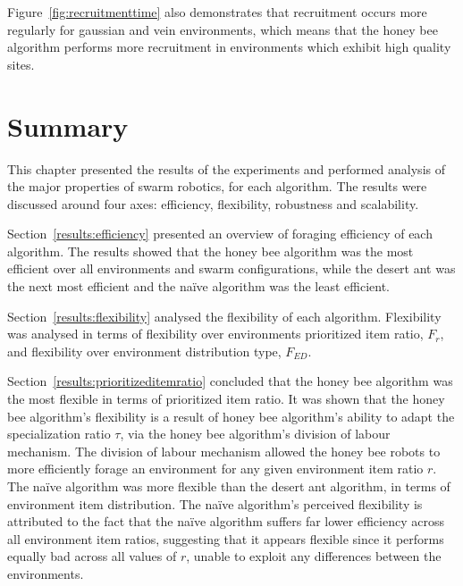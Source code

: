 Figure~\ref{fig:recruitmenttime} also demonstrates that recruitment occurs more regularly for gaussian and vein environments, which means that the honey bee algorithm performs more recruitment in environments which exhibit high quality sites.

\section{Summary}
\label{results:summary}

This chapter presented the results of the experiments and performed analysis of the major properties of swarm robotics, for each algorithm. The results were discussed around four axes: efficiency, flexibility, robustness and scalability. 

Section~\ref{results:efficiency} presented an overview of foraging efficiency of each algorithm. The results showed that the honey bee algorithm was the most efficient over all environments and swarm configurations, while the desert ant was the next most efficient and the na\"ive algorithm was the least efficient.

Section~\ref{results:flexibility} analysed the flexibility of each algorithm. Flexibility was analysed in terms of flexibility over environments prioritized item ratio, $F_r$, and flexibility over environment distribution type, $F_{ED}$. 

Section~\ref{results:prioritizeditemratio} concluded that the honey bee algorithm was the most flexible in terms of prioritized item ratio. It was shown that the honey bee algorithm's flexibility is a result of honey bee algorithm's ability to adapt the specialization ratio $\tau$, via the honey bee algorithm's division of labour mechanism. The division of labour mechanism allowed the honey bee robots to more efficiently forage an environment for any given environment item ratio $r$. The na\"ive algorithm was more flexible than the desert ant algorithm, in terms of environment item distribution. The na\"ive algorithm's perceived flexibility is attributed to the fact that the na\"ive algorithm suffers far lower efficiency across all environment item ratios, suggesting that it appears flexible since it performs equally bad across all values of $r$, unable to exploit any differences between the environments. 

